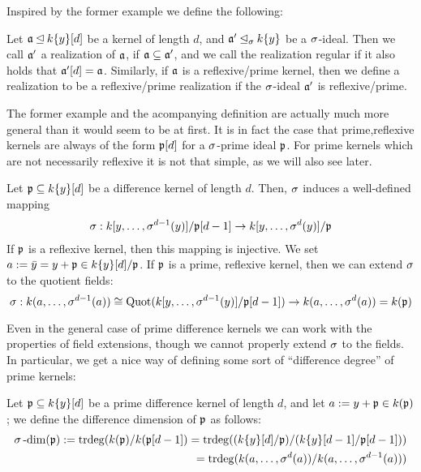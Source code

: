 Inspired by the former example we define the following:
\begin{defn}
Let $\mathfrak{a} \unlhd k\{y\}[d]$ be a kernel of length $d$, and $\mathfrak{a}' \unlhd_{\sigma} k\{y\}$ be a $\sigma$-ideal. Then we call $\mathfrak{a}'$ a realization of $\mathfrak{a}$, if $\mathfrak{a} \subseteq \mathfrak{a}'$, 
and we call the realization regular if it also holds that $\mathfrak{a}'[d] = \mathfrak{a}$. Similarly, if $\mathfrak{a}$ is a reflexive/prime kernel, then we define a realization to be a reflexive/prime realization if the $\sigma$-ideal $\mathfrak{a}'$ is reflexive/prime.
\end{defn}

The former example and the acompanying definition are actually much more general than it would seem to be at first. 
It is in fact the case that prime,reflexive kernels are always of the form $\mathfrak{p}[d]$ for a $\sigma$-prime ideal $\mathfrak{p}$.
For prime kernels which are not necessarily reflexive it is not that simple, as we will also see later. 

\begin{rem}\label{sigmawelldeffker}
Let $\mathfrak{p} \subseteq k\{y\}[d]$ be a difference kernel of length $d$. Then, $\sigma$ induces a well-defined mapping 
\begin{align*}
\sigma: k[y,\ldots,\sigma^{d-1}(y)]/\mathfrak{p}[d-1] \rightarrow k[y,\ldots,\sigma^{d}(y)]/\mathfrak{p}
\end{align*}
If $\mathfrak{p}$ is a reflexive kernel, then this mapping is injective. 
We set $a := \bar y = y + \mathfrak{p} \in k\{y\}[d]/\mathfrak{p}$. If $\mathfrak{p}$ is a prime, reflexive kernel, then we can extend $\sigma$ to the quotient fields:
\[ \sigma: k(a,\ldots,\sigma^{d-1}(a)) \cong \text{Quot}(k[y,\ldots,\sigma^{d-1}(y)]/\mathfrak{p}[d-1]) \rightarrow k(a,\ldots,\sigma^d(a)) = k(\mathfrak{p}) \]
\end{rem}

Even in the general case of prime difference kernels we can work with the properties of field extensions, though we cannot properly extend $\sigma$ to the fields.
 In particular, we get a nice way of defining some sort of ``difference degree'' of prime kernels:
\begin{defn}
Let $\mathfrak{p} \subseteq k\{y\}[d]$ be a prime difference kernel of length $d$, and let $a:= y + \mathfrak{p} \in k(\mathfrak{p})$; we define the difference dimension of $\mathfrak{p}$ as follows:
\begin{align*} \sigma\operatorname{-dim}(\mathfrak{p}) := \operatorname{trdeg}(k(\mathfrak{p})/k(\mathfrak{p}[d-1]) = \operatorname{trdeg}((k\{y\}[d]/\mathfrak{p})/(k\{y\}[d-1]/\mathfrak{p}[d-1])) \\  = \operatorname{trdeg}(k(a,\ldots,\sigma^{d}(a))/k(a,\ldots,\sigma^{d-1}(a))) \end{align*}
\end{defn}

